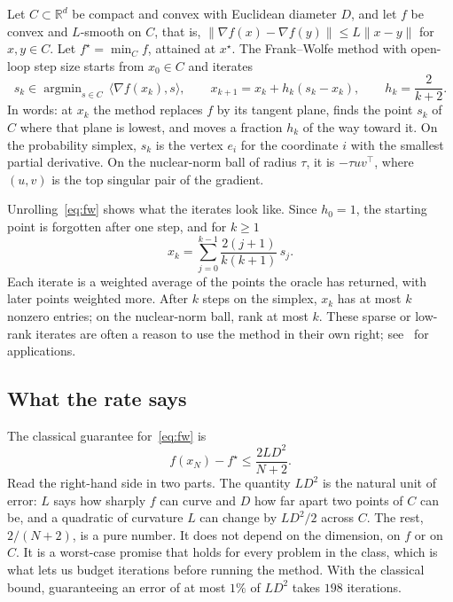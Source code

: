 \documentclass[11pt]{article}
\theoremstyle{remark}
\DeclareMathOperator*{\argmin}{argmin}
\newcommand{\R}{\mathbb{R}}
\begin{document}
Let $C\subset\R^d$ be compact and convex with Euclidean diameter $D$, and let $f$
be convex and $L$-smooth on $C$, that is,
$\|\nabla f(x)-\nabla f(y)\|\le L\|x-y\|$ for $x,y\in C$. Let $f^\star=\min_C f$,
attained at $x^\star$. The Frank--Wolfe method with open-loop step size starts
from $x_0\in C$ and iterates
\begin{equation}\label{eq:fw}
  s_k \in \argmin_{s\in C}\,\langle \nabla f(x_k), s\rangle,\qquad
  x_{k+1} = x_k + h_k(s_k-x_k),\qquad
  h_k = \frac{2}{k+2}.
\end{equation}
In words: at $x_k$ the method replaces $f$ by its tangent plane, finds the point
$s_k$ of $C$ where that plane is lowest, and moves a fraction $h_k$ of the way
toward it. On the probability simplex, $s_k$ is the vertex $e_i$ for the
coordinate $i$ with the smallest partial derivative. On the nuclear-norm ball of
radius $\tau$, it is $-\tau uv^{\top}$, where $(u,v)$ is the top singular pair of
the gradient.

Unrolling~\eqref{eq:fw} shows what the iterates look like. Since $h_0=1$, the
starting point is forgotten after one step, and for $k\ge1$
\begin{equation}\label{eq:average}
  x_k = \sum_{j=0}^{k-1} \frac{2(j+1)}{k(k+1)}\, s_j .
\end{equation}
Each iterate is a weighted average of the points the oracle has returned, with
later points weighted more. After $k$ steps on the simplex, $x_k$ has at most $k$
nonzero entries; on the nuclear-norm ball, rank at most $k$. These sparse or
low-rank iterates are often a reason to use the method in their own right;
see~\cite{BCC22} for applications.

\subsection{What the rate says}

The classical guarantee for~\eqref{eq:fw} is~\cite{Jag13}
\[
  f(x_N) - f^\star \le \frac{2LD^2}{N+2}.
\]
Read the right-hand side in two parts. The quantity $LD^2$ is the natural unit of
error: $L$ says how sharply $f$ can curve and $D$ how far apart two points of $C$
can be, and a quadratic of curvature $L$ can change by $LD^2/2$ across $C$. The
rest, $2/(N+2)$, is a pure number. It does not depend on the dimension, on $f$ or
on $C$. It is a worst-case promise that holds for every problem in the class,
which is what lets us budget iterations before running the method. With the
classical bound, guaranteeing an error of at most $1\%$ of $LD^2$ takes $198$
iterations.
\end{document}
